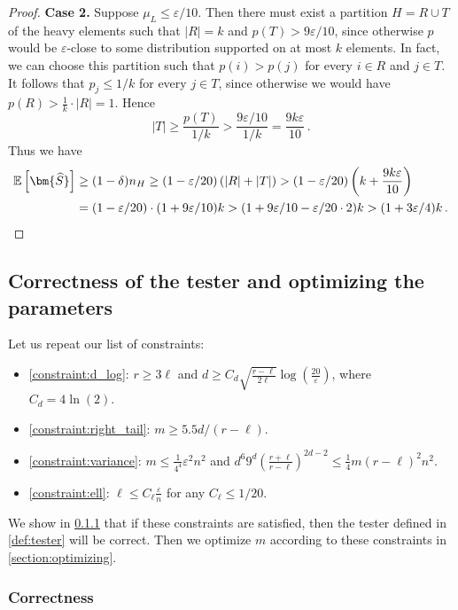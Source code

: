 \documentclass[10pt,a4paper]{article}
\newcommand{\Ex}[1]{\bE \left[ #1 \right]}
\newcommand{\bE}{\ensuremath{\mathbb{E}}}
\renewcommand{\epsilon}{\varepsilon}
\begin{document}
\begin{proof}
    \textbf{Case 2.} Suppose $\mu_L \le \epsilon/10$. Then there must exist a partition $H = R \cup
    T$ of the heavy elements such that $|R| = k$ and $p(T) > 9\epsilon/10$, since otherwise $p$ would
    be $\epsilon$-close to some distribution supported on at most $k$ elements. In fact, we can
    choose this partition such that $p(i) > p(j)$ for every $i \in R$ and $j \in T$. It follows that
    $p_j \le 1/k$ for every $j \in T$, since otherwise we would have $p(R) > \frac{1}{k} \cdot |R| =
    1$. Hence
    \[
        |T| \ge \frac{p(T)}{1/k} > \frac{9\epsilon/10}{1/k} = \frac{9 k \epsilon}{10} \,.
    \]
    Thus we have
    \begin{align*}
        \Ex{\bm{\widehat S}}
        &\ge (1-\delta) n_H
        \ge (1-\epsilon/20) \left( |R| + |T| \right)
        > (1-\epsilon/20) \left( k + \frac{9 k \epsilon}{10} \right) \\
        &= (1-\epsilon/20) \cdot (1 + 9\epsilon/10) k
        > (1 + 9\epsilon/10 - \epsilon/20 \cdot 2) k
        > (1 + 3\epsilon/4) k \,. \qedhere
    \end{align*}
\end{proof}

\subsection{Correctness of the tester and optimizing the parameters}
\label{section:correctness_and_parameters}

Let us repeat our list of constraints:
\begin{itemize}
\item \cref{constraint:d_log}: $r \ge 3\ell$ and
    $d \geq C_d \sqrt{\frac{r-\ell}{2\ell}} \log \left(\frac{20}{\epsilon} \right)$, where $C_d =
    4\ln(2)$.
\item \cref{constraint:right_tail}: $m \geq 5.5 d/(r-\ell)$.
\item \cref{constraint:variance}:
    $m \leq \tfrac{1}{4^4} \epsilon^2 n^2$ and
    $d^6 9^d \left(\frac{r+\ell}{r-\ell}\right)^{2d-2} \leq \tfrac{1}{4} m(r-\ell)^2 n^2$.
\item \cref{constraint:ell}: $\ell \leq C_\ell \frac{\epsilon}{n}$ for any $C_\ell \leq 1/20$.
\end{itemize}
We show in \cref{section:correctness} that if these constraints are satisfied, then the tester defined in \cref{def:tester}
will be correct. Then we optimize $m$ according to these constraints in \cref{section:optimizing}.


\subsubsection{Correctness}
\label{section:correctness}
\end{document}
